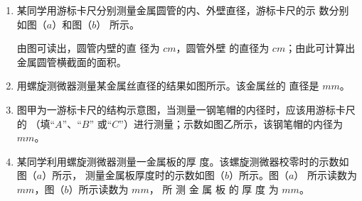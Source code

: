 


\begin{enumerate}
\renewcommand{\labelenumi}{\arabic{enumi}.}
\item
{}
某同学用游标卡尺分别测量金属圆管的内、外壁直径，游标卡尺的示
数分别如图（$ a $）和图（$ b $）
所示。
\begin{figure}[h!]
\centering

\end{figure}


由图可读出，圆管内壁的直
径为  $ cm $，圆管外壁
的直径为  $ cm $；由此可计算出金属圆管横截面的面积。


\item 
{}
用螺旋测微器测量某金属丝直径的结果如图所示。该金属丝的
直径是
$ mm $。
\begin{figure}[h!]
\centering

\end{figure}









\item
{}
图甲为一游标卡尺的结构示意图，当测量一钢笔帽的内径时，应该用游标卡尺的  （填“$ A $”、“$ B $”
或“$ C $”）进行测量；示数如图乙所示，该钢笔帽的内径为  $ mm $。
\begin{figure}[h!]
\centering

\end{figure}




\newpage
\item
{}
某同学利用螺旋测微器测量一金属板的厚
度。该螺旋测微器校零时的示数如图（$ a $）所示，
测量金属板厚度时的示数如图（$ b $）所示。图（$ a $）
所示读数为  $ mm $，图（$ b $）所示读数为
$ mm $， 所 测 金 属 板 的 厚 度 为
$ mm $。
\begin{figure}[h!]
\centering

\end{figure}



\end{enumerate}
